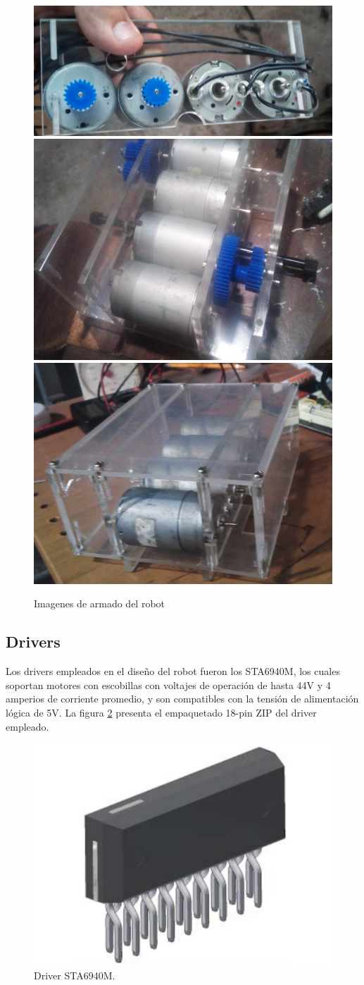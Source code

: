 \begin{figure}[H]
	\centering		\includegraphics[width=0.7\linewidth]{imagenes/prototipo/Motores}
	\includegraphics[width=0.4\linewidth]{imagenes/prototipo/CajaColocandoEngranejes}
	\includegraphics[width=0.4\linewidth]{imagenes/prototipo/CajaLista}

	\caption{Imagenes de armado del robot}
	\label{imagen:construccionFinalRobot}
\end{figure}



\subsection{Drivers}

Los drivers empleados en el diseño del robot fueron los STA6940M, los cuales soportan motores con escobillas con voltajes de operación de hasta 44V y 4 amperios de corriente promedio, y son compatibles con la tensión de alimentación lógica de 5V. La figura \ref{imagen:Driver} presenta el empaquetado 18-pin ZIP del driver empleado.

\begin{figure}[H]
	\centering		\includegraphics[width=0.3\linewidth]{imagenes/prototipo/Driver}
	\caption{Driver STA6940M. }
	\label{imagen:Driver}
\end{figure}

